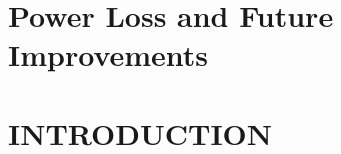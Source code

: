 \documentclass[a4paper,
              ]{jacow}
\begin{document}
\section{Power Loss and Future Improvements}

%
%
%

% 

\section{INTRODUCTION}
\end{document}
